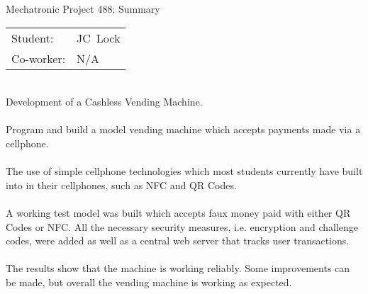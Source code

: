 
\begin{Summary}{Mechatronic Project 488: Summary}

   \noindent
   \begin{tabular}{@{}ll@{}}
      \textsf{Student:}  &  JC\ Lock\\
      \textsf{Co-worker:} & N/A
   \end{tabular}

\begin{SumTable}
 \hline%
 \\
 \hline%
 Development of a Cashless Vending Machine.
 \\

 \hline%
 \\
 \hline%
 Program and build a model vending machine which accepts payments made via a cellphone.
 \\

 \hline%
 \\
 \hline%
 The use of simple cellphone technologies which most students currently have built
 into in their cellphones, such as NFC and QR Codes.
 \\
   
 \hline%
 \\
 \hline%
 A working test model was built which accepts faux money paid with either QR Codes or NFC. All
 the necessary security measures, i.e. encryption and challenge codes, were added as well as a
 central web server that tracks user transactions.
 \\

 \hline%
 \\
 \hline%
 The results show that the machine is working reliably. Some improvements can be made, but
 overall the vending machine is working as expected.
 \\


\end{SumTable}
\end{Summary}
